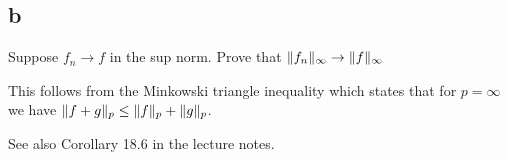 \documentclass[]{article}
\DeclarePairedDelimiter\norm{\lVert}{\rVert}
\begin{document}
		\subsection*{b}
		\begin{em}
			Suppose $f_n \to f$ in the sup norm. Prove that $\norm{f_n}_\infty \to \norm{f}_\infty$
		\end{em}

			




			This follows from the Minkowski triangle inequality which states that for $p = \infty$ we have $\norm{f + g}_p \leq \norm{f}_p + \norm{g}_p$. 

			See also Corollary 18.6 in the lecture notes.
			
\end{document}
